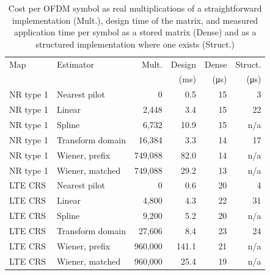 \begin{table}[b]
\caption{Cost per OFDM symbol as real multiplications of a straightforward implementation (Mult.), design time of the matrix, and measured application time per symbol as a stored matrix (Dense) and as a structured implementation where one exists (Struct.)}
\label{tab:cost}
\centering
\footnotesize
\setlength{\tabcolsep}{1.6pt}
\begin{tabular}{llrrrr}
\toprule
Map & Estimator & Mult. & Design & Dense & Struct. \\
 & & & (ms) & (\si{\micro\second}) & (\si{\micro\second}) \\
\midrule
NR type 1 & Nearest pilot & 0 & 0.5 & 15 & 3 \\
NR type 1 & Linear & 2,448 & 3.4 & 15 & 22 \\
NR type 1 & Spline & 6,732 & 10.9 & 15 & n/a \\
NR type 1 & Transform domain & 16,384 & 3.3 & 14 & 17 \\
NR type 1 & Wiener, prefix & 749,088 & 82.0 & 14 & n/a \\
NR type 1 & Wiener, matched & 749,088 & 29.2 & 13 & n/a \\
LTE CRS & Nearest pilot & 0 & 0.6 & 20 & 4 \\
LTE CRS & Linear & 4,800 & 4.3 & 22 & 31 \\
LTE CRS & Spline & 9,200 & 5.2 & 20 & n/a \\
LTE CRS & Transform domain & 27,606 & 8.4 & 23 & 24 \\
LTE CRS & Wiener, prefix & 960,000 & 141.1 & 21 & n/a \\
LTE CRS & Wiener, matched & 960,000 & 25.4 & 19 & n/a \\
\bottomrule
\end{tabular}
\end{table}
